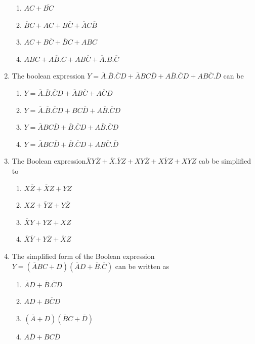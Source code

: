 \documentclass[journal,12pt,twocolumn]{IEEEtran}
\begin{document}
\begin{enumerate}
     \begin{enumerate}
      \item $AC+\overline{BC}$ 
      \item $\overline{B}C+AC+B\overline{C}+\overline{A}C\overline{B}$
      \item $AC+B\overline{C}+\overline{B}C+ABC$
      \item $ABC+A\overline{B}.C+AB\overline{C}+\overline{A}.B.\overline{C}$
    \end{enumerate}
    \item The boolean expression $Y=\overline{A}.\overline{B}.\overline{C}D+\overline{A}BC\overline{D}+A\overline{B}.\overline{C}
D+AB\overline{C}.\overline{D}$ can be
\begin{enumerate} 
      \item $Y=\overline{A}.\overline{B}.\overline{C}D+\overline{A}B\overline{C}+A\overline{C}D$
      \item $Y=\overline{A}.\overline{B}.\overline{C}D+BC\overline{D}+A\overline{B}.\overline{C}D$
      \item $Y=\overline{A}BC\overline{D}+\overline{B}.\overline{C}D+
A\overline{B}.\overline{C}D$
      \item $Y=\overline{A}BC\overline{D}+\overline{B}.\overline{C}D+
AB\overline{C}.\overline{D}$
    \end{enumerate}
 \item The Boolean expression$ \overline{X}Y\overline{Z}+\overline{X}.\overline{Y}Z+XY\overline{Z}
+X\overline{Y}Z+XYZ$ cab be simplified to
\begin{enumerate}
      \item $X\overline{Z}+\overline{X}Z+YZ$
      \item $XZ+\overline{Y}Z+Y\overline{Z}$
      \item $\overline{X}Y+YZ+XZ$
      \item $\overline{X}\overline{Y}+Y\overline{Z}+\overline{X}Z$
    \end{enumerate}
\item The simplified form of the Boolean expression $Y=(\overline{A}BC+D)(\overline{A}D+\overline{B}.\overline{C})$ can be written as
   \begin{enumerate}
      \item $\overline{A}D+\overline{B}.\overline{C}D$
      \item $AD+B\overline{C}D$
      \item $(\overline{A}+D)(\overline{B}C+\overline{D})$
      \item $A\overline{D}+BC\overline{D}$

\end{enumerate}
\end{enumerate}
\end{document}
